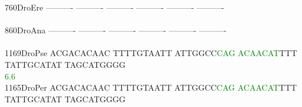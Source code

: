 \documentclass[11pt,twoside,reqno,a4paper]{article}
\begin{document}
{760\hspace*{2\charwidth}DroEre	----------	----------	----------	----------	----------	----------	\\
\hspace*{5\charwidth}\hspace*{7\charwidth}\hspace*{1\charwidth}\hspace*{1\charwidth}\hspace*{1\charwidth}\hspace*{1\charwidth}\hspace*{1\charwidth}\hspace*{1\charwidth}\\
860\hspace*{2\charwidth}DroAna	----------	----------	----------	----------	----------	----------	\\
\hspace*{5\charwidth}\hspace*{7\charwidth}\hspace*{1\charwidth}\hspace*{1\charwidth}\hspace*{1\charwidth}\hspace*{1\charwidth}\hspace*{1\charwidth}\hspace*{1\charwidth}\\
1169\hspace*{1\charwidth}DroPse	ACGACACAAC	TTTTGTAATT	ATTGGCC\textcolor{Green}{C}\textcolor{Green}{A}\textcolor{Green}{G}	\textcolor{Green}{A}\textcolor{Green}{C}\textcolor{Green}{A}\textcolor{Green}{A}\textcolor{Green}{C}\textcolor{Green}{A}\textcolor{Green}{T}TTT	TATTGCATAT	TAGCATGGGG	\\
\hspace*{5\charwidth}\hspace*{7\charwidth}\hspace*{1\charwidth}\hspace*{1\charwidth}\hspace*{27\charwidth}\textcolor{Green}{6.6}\hspace*{1\charwidth}\hspace*{1\charwidth}\hspace*{1\charwidth}\hspace*{1\charwidth}\\
1165\hspace*{1\charwidth}DroPer	ACGACACAAC	TTTTGTAATT	ATTGGCC\textcolor{Green}{C}\textcolor{Green}{A}\textcolor{Green}{G}	\textcolor{Green}{A}\textcolor{Green}{C}\textcolor{Green}{A}\textcolor{Green}{A}\textcolor{Green}{C}\textcolor{Green}{A}\textcolor{Green}{T}TTT	TATTGCATAT	TAGCATGGGG	\\
}
\end{document}
